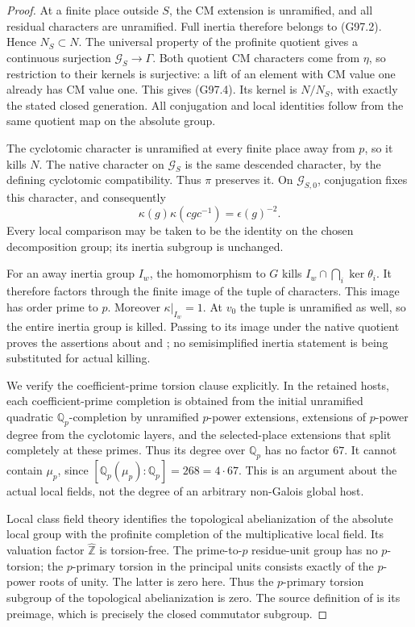 \begin{proof}
At a finite place outside \(S\), the CM extension is
unramified, and all residual characters are unramified.
Full inertia therefore belongs to (G97.2).  Hence
\(N_S\subset N\).  The universal property of the profinite
quotient gives a continuous surjection
\(\mathcal G_S\to\Gamma\).  Both quotient CM characters
come from \(\eta\), so restriction to their kernels is
surjective: a lift of an element with CM value one already
has CM value one.  This gives (G97.4).
Its kernel is \(N/N_S\), with exactly the stated closed
generation.  All conjugation and local identities follow
from the same quotient map on the absolute group.

The cyclotomic character is unramified at every finite place
away from \(p\), so it kills \(N\).  The native character
on \(\mathcal G_S\) is the same descended character, by
the defining  cyclotomic compatibility.
Thus \(\pi\) preserves it.
On \(\mathcal G_{S,0}\), conjugation fixes this character,
and consequently
\[
 \kappa(g)\kappa(cgc^{-1})=\epsilon(g)^{-2}.
 \tag{G97.6}
\]
Every local comparison may be taken to be the identity on
the chosen decomposition group; its inertia subgroup is
unchanged.

For an away inertia group \(I_w\), the homomorphism to
\(G\) kills \(I_w\cap\bigcap_i\ker\theta_i\).
It therefore factors through the finite image of the tuple
of characters.  This image has order prime to \(p\).
Moreover \(\kappa|_{I_w}=1\).  At \(v_0\) the tuple is
unramified as well, so the entire inertia group is killed.
Passing to its image under the native quotient proves the
assertions about  and ; no semisimplified
inertia statement is being substituted for actual killing.

We verify the coefficient-prime torsion clause explicitly.
In the retained hosts, each coefficient-prime completion
is obtained from the initial unramified quadratic
\(\mathbb Q_p\)-completion by unramified \(p\)-power
extensions, extensions of \(p\)-power degree from the
cyclotomic layers, and the selected-place extensions that
split completely at these primes.  Thus its degree over
\(\mathbb Q_p\) has no factor \(67\).
It cannot contain \(\mu_p\), since
\([\mathbb Q_p(\mu_p):\mathbb Q_p]=268=4\cdot67\).
This is an argument about the actual local fields, not the
degree of an arbitrary non-Galois global host.

Local class field theory identifies the topological
abelianization of the absolute local group with the
profinite completion of the multiplicative local field.
Its valuation factor \(\widehat{\mathbb Z}\) is torsion-free.
The prime-to-\(p\) residue-unit group has no \(p\)-torsion;
the \(p\)-primary torsion in the principal units consists
exactly of the \(p\)-power roots of unity.
The latter is zero here.  Thus the \(p\)-primary torsion
subgroup of the topological abelianization is zero.
The source definition of  is its preimage,
which is precisely the closed commutator subgroup.


\end{proof}
